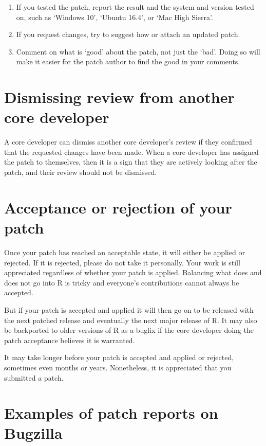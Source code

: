 \documentclass[
]{book}
\begin{document}
\begin{enumerate}
\def\labelenumi{\arabic{enumi}.}
\item
  If you tested the patch, report the result and the system and version tested on, such as `Windows 10', `Ubuntu 16.4', or `Mac High Sierra'.
\item
  If you request changes, try to suggest how or attach an updated patch.
\item
  Comment on what is `good' about the patch, not just the `bad'. Doing so will make it easier for the patch author to find the good in your comments.
\end{enumerate}

\section{Dismissing review from another core developer}\label{dismissing-review-from-another-core-developer}

A core developer can dismiss another core developer's review if they confirmed that the requested changes have been made. When a core developer has assigned the patch to themselves, then it is a sign that they are actively looking after the patch, and their review should not be dismissed.

\section{Acceptance or rejection of your patch}\label{acceptance-or-rejection-of-your-patch}

Once your patch has reached an acceptable state, it will either be applied or rejected. If it is rejected, please do not take it personally. Your work is still appreciated regardless of whether your patch is applied. Balancing what does and does not go into R is tricky and everyone's contributions cannot always be accepted.

But if your patch is accepted and applied it will then go on to be released with the next patched release and eventually the next major release of R. It may also be backported to older versions of R as a bugfix if the core developer doing the patch acceptance believes it is warranted.

It may take longer before your patch is accepted and applied or rejected, sometimes even months or years. Nonetheless, it is appreciated that you submitted a patch.

\section{Examples of patch reports on Bugzilla}\label{examples-of-patch-reports-on-bugzilla}
\end{document}
